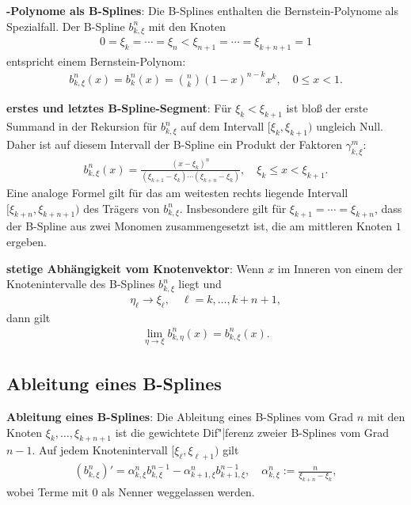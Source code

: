 \linie

\textbf{-Polynome als B-Splines}:
Die B-Splines enthalten die Bernstein-Polynome als Spezialfall.
Der B-Spline $b_{k,\xi}^n$ mit den Knoten
\begin{align*}
    0 = \xi_k = \dotsb = \xi_n < \xi_{n+1} = \dotsb = \xi_{k+n+1} = 1
\end{align*}
entspricht einem Bernstein-Polynom:
\begin{align*}
    b_{k,\xi}^n(x) = b_k^n(x) = \binom{n}{k} (1 - x)^{n - k} x^k,\quad 0 \le x < 1.
\end{align*}

\linie

\textbf{erstes und letztes B-Spline-Segment}:
Für $\xi_k < \xi_{k+1}$ ist bloß der erste Summand in der Rekursion für $b_{k,\xi}^n$
auf dem Intervall $[\xi_k, \xi_{k+1})$ ungleich Null.
Daher ist auf diesem Intervall der B-Spline ein Produkt der Faktoren $\gamma_{k,\xi}^m$:
\begin{align*}
    b_{k,\xi}^n(x) = \frac{(x - \xi_k)^n}{(\xi_{k+1} - \xi_k) \dotsm (\xi_{k+n} - \xi_k)},\quad
    \xi_k \le x < \xi_{k+1}.
\end{align*}
Eine analoge Formel gilt für das am weitesten rechts liegende Intervall $[\xi_{k+n}, \xi_{k+n+1})$
des Trägers von $b_{k,\xi}^n$.
Insbesondere gilt für $\xi_{k+1} = \dotsb = \xi_{k+n}$, dass der B-Spline aus zwei Monomen
zusammengesetzt ist, die am mittleren Knoten $1$ ergeben.

\linie

\textbf{stetige Abhängigkeit vom Knotenvektor}:
Wenn $x$ im Inneren von einem der Knotenintervalle des B-Splines $b_{k,\xi}^n$ liegt und
\begin{align*}
    \eta_\ell \to \xi_\ell,\quad \ell = k, \dotsc, k + n + 1,
\end{align*}
dann gilt
\begin{align*}
    \lim_{\eta \to \xi} b_{k,\eta}^n(x) = b_{k,\xi}^n(x).
\end{align*}

\subsection{%
    Ableitung eines B-Splines%
}

\textbf{Ableitung eines B-Splines}:
Die Ableitung eines B-Splines vom Grad $n$ mit den Knoten $\xi_k, \dotsc, \xi_{k+n+1}$
ist die gewichtete Dif"|ferenz zweier B-Splines vom Grad $n - 1$.
Auf jedem Knotenintervall $[\xi_\ell, \xi_{\ell+1})$ gilt
\begin{align*}
    (b_{k,\xi}^n)' = \alpha_{k,\xi}^n b_{k,\xi}^{n-1} - \alpha_{k+1,\xi}^n b_{k+1,\xi}^{n-1},\quad
    \alpha_{k,\xi}^n := \frac{n}{\xi_{k+n} - \xi_k},
\end{align*}
wobei Terme mit $0$ als Nenner weggelassen werden.

